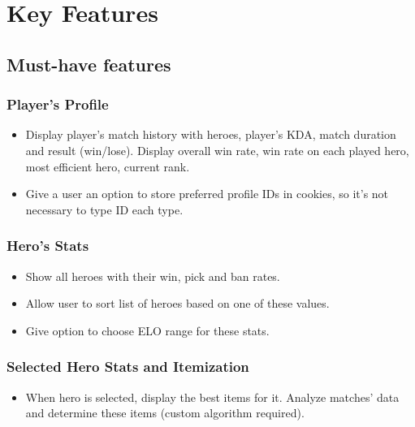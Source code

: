 \section{Key Features}

\subsection{Must-have features}

\subsubsection{Player's Profile}

\begin{itemize}

    \item Display player's match history with heroes, player's KDA, match duration and result (win/lose).
    Display overall win rate, win rate on each played hero, most efficient hero, current rank.
    \item Give a user an option to store preferred profile IDs in cookies, so it's not necessary to type ID each type.

\end{itemize}

\subsubsection{Hero's Stats}

\begin{itemize}

    \item Show all heroes with their win, pick and ban rates.
    \item Allow user to sort list of heroes based on one of these values.
    \item Give option to choose ELO range for these stats.

\end{itemize}

\subsubsection{Selected Hero Stats and Itemization}

\begin{itemize}

    \item When hero is selected, display the best items for it.
    Analyze matches' data and determine these items (custom algorithm required).

\end{itemize}

